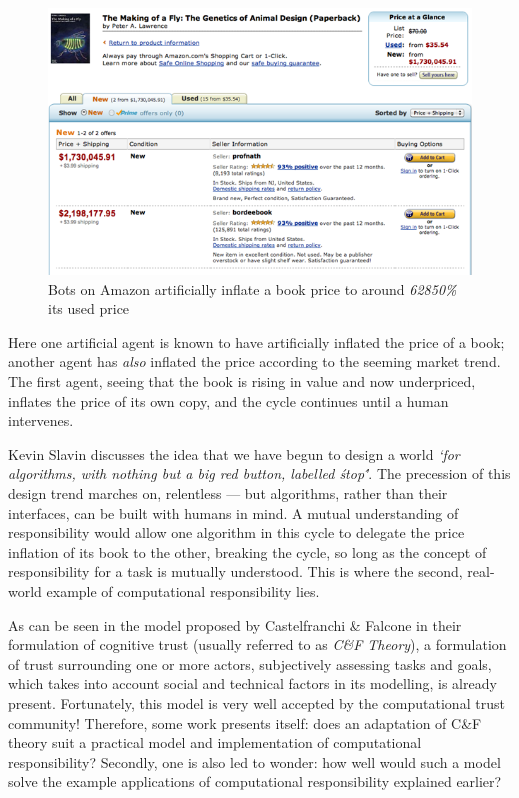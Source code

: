 \begin{figure}[ht]
\centering
\includegraphics[trim=0.7cm 0.7cm 0.7cm 0.7cm, scale=0.75]{images/amazon_price_hike_fly_genetics}
\caption{Bots on Amazon artificially inflate a book price to around \emph{62850\%} its used price}
\end{figure}

Here one artificial agent is known to have artificially inflated the price of a book; another agent has \emph{also} inflated the price according to the seeming market trend. The first agent, seeing that the book is rising in value and now underpriced, inflates the price of its own copy, and the cycle continues until a human intervenes. \par

Kevin Slavin discusses the idea that we have begun to design a world \emph{`for algorithms\cite{SlavinHOWWORLD}, with nothing but a big red button, labelled \'stop\''}. The precession of this design trend marches on, relentless --- but algorithms, rather than their interfaces, can be built with humans in mind. A mutual understanding of responsibility would allow one algorithm in this cycle to delegate the price inflation of its book to the other, breaking the cycle, so long as the concept of responsibility for a task is mutually understood. This is where the second, real-world example of computational responsibility lies. \par

As can be seen in the model proposed by Castelfranchi \& Falcone in their formulation of cognitive trust\cite{CastelfranchiSocialApproach} (usually referred to as \emph{C\&F Theory}), a formulation of trust surrounding one or more actors, subjectively assessing tasks and goals, which takes into account social and technical factors in its modelling, is already present. Fortunately, this model is very well accepted by the computational trust community! Therefore, some work presents itself: does an adaptation of C\&F theory suit a practical model and implementation of computational responsibility? Secondly, one is also led to wonder: how well would such a model solve the example applications of computational responsibility explained earlier?


